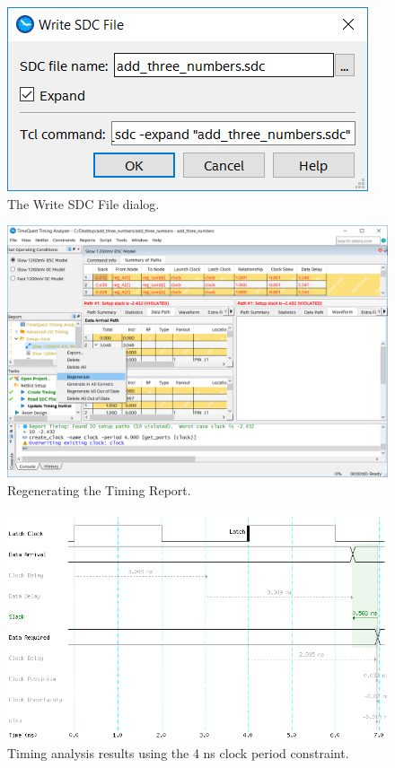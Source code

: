 \documentclass[11pt, twoside, pdftex]{article}
\begin{document}
\begin{figure}[H]
\begin{center}
\includegraphics[scale=0.55]{figures/setconstraint4.png}
\end{center}
\caption{The Write SDC File dialog.}
\label{fig:setconstraint4}
\end{figure}

\begin{figure}[H]
\begin{center}
\includegraphics[scale=0.5]{figures/setconstraint5.png}
\end{center}
\caption{Regenerating the Timing Report.}
\label{fig:setconstraint5}
\end{figure}

\begin{figure}[H]
\begin{center}
\includegraphics[scale=0.55]{figures/SB8.png}
\end{center}
\caption{Timing analysis results using the 4 ns clock period constraint.}
\label{fig:SB8}
\end{figure}
\end{document}
